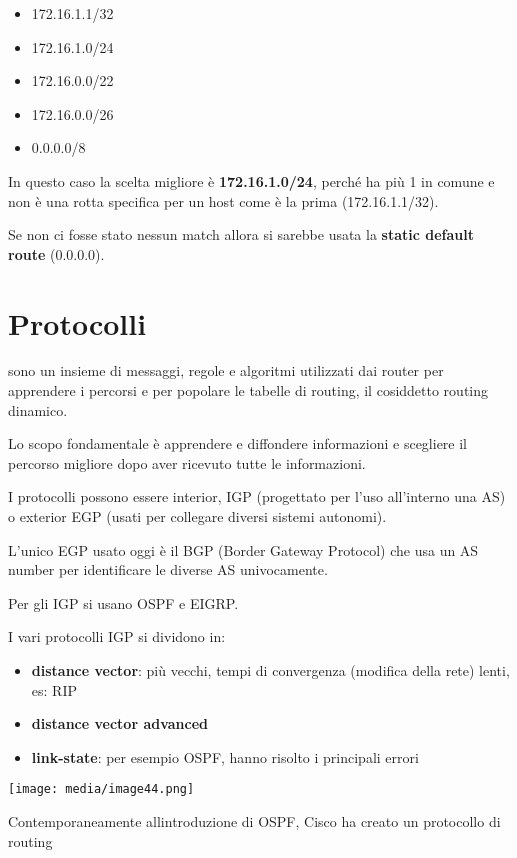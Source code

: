 \begin{itemize}
\item
  172.16.1.1/32
\item
  172.16.1.0/24
\item
  172.16.0.0/22
\item
  172.16.0.0/26
\item
  0.0.0.0/8
\end{itemize}

In questo caso la scelta migliore è \textbf{172.16.1.0/24}, perché ha
più 1 in comune e non è una rotta specifica per un host come è la prima
(172.16.1.1/32).

Se non ci fosse stato nessun match allora si sarebbe usata la
\textbf{static default route} (0.0.0.0).

\section{Protocolli}\label{protocolli}

sono un insieme di messaggi, regole e algoritmi utilizzati dai router
per apprendere i percorsi e per popolare le tabelle di routing, il
cosiddetto routing dinamico.

Lo scopo fondamentale è apprendere e diffondere informazioni e scegliere
il percorso migliore dopo aver ricevuto tutte le informazioni.

I protocolli possono essere interior, IGP (progettato per l'uso
all'interno una AS) o exterior EGP (usati per collegare diversi sistemi
autonomi).

L'unico EGP usato oggi è il BGP (Border Gateway Protocol) che usa un AS
number per identificare le diverse AS univocamente.

Per gli IGP si usano OSPF e EIGRP.

I vari protocolli IGP si dividono in:

\begin{itemize}
\item
  \textbf{distance vector}: più vecchi, tempi di convergenza (modifica
  della rete) lenti, es: RIP
\item
  \textbf{distance vector advanced}
\item
  \textbf{link-state}: per esempio OSPF, hanno risolto i principali
  errori
\end{itemize}

\texttt{[image: media/image44.png]}

Contemporaneamente all\textquotesingle introduzione di OSPF, Cisco ha
creato un protocollo di routing

